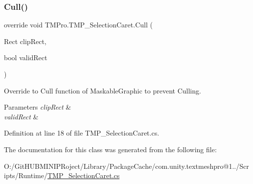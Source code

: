 \subsubsection{\texorpdfstring{Cull()}{Cull()}}
{\footnotesize\ttfamily override void T\+M\+Pro.\+T\+M\+P\+\_\+\+Selection\+Caret.\+Cull (\begin{DoxyParamCaption}\item[{Rect}]{clip\+Rect,  }\item[{bool}]{valid\+Rect }\end{DoxyParamCaption})}



Override to Cull function of Maskable\+Graphic to prevent Culling. 


\begin{DoxyParams}{Parameters}
{\em clip\+Rect} & \\
\hline
{\em valid\+Rect} & \\
\hline
\end{DoxyParams}


Definition at line 18 of file T\+M\+P\+\_\+\+Selection\+Caret.\+cs.



The documentation for this class was generated from the following file\+:\begin{DoxyCompactItemize}
\item 
O\+:/\+Git\+H\+U\+B\+M\+I\+N\+I\+P\+Roject/\+Library/\+Package\+Cache/com.\+unity.\+textmeshpro@1../\+Scripts/\+Runtime/\mbox{\hyperlink{_t_m_p___selection_caret_8cs}{T\+M\+P\+\_\+\+Selection\+Caret.\+cs}}\end{DoxyCompactItemize}

